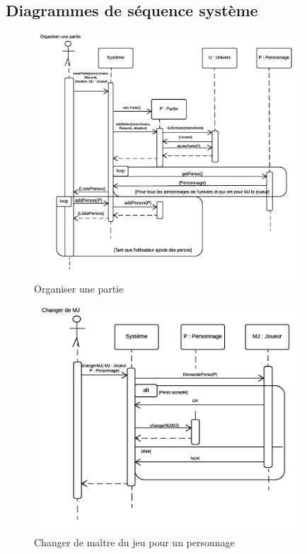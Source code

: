 \documentclass[a4paper,oneside,10pt]{article}
\begin{document}
\subsection{Diagrammes de séquence système}
\begin{figure}[!ht]
	\begin{center}
		\includegraphics[width=10cm]{images/sequence/DS-OrganiserPartie.png}  
		\caption{Organiser une partie}
	\end{center}
\end{figure}
\begin{figure}[!ht]
	\begin{center}
		\includegraphics[width=10cm]{images/sequence/DS-ChangerMJ.png}  
		\caption{Changer de maître du jeu pour un personnage}
	\end{center}
\end{figure}
\end{document}
